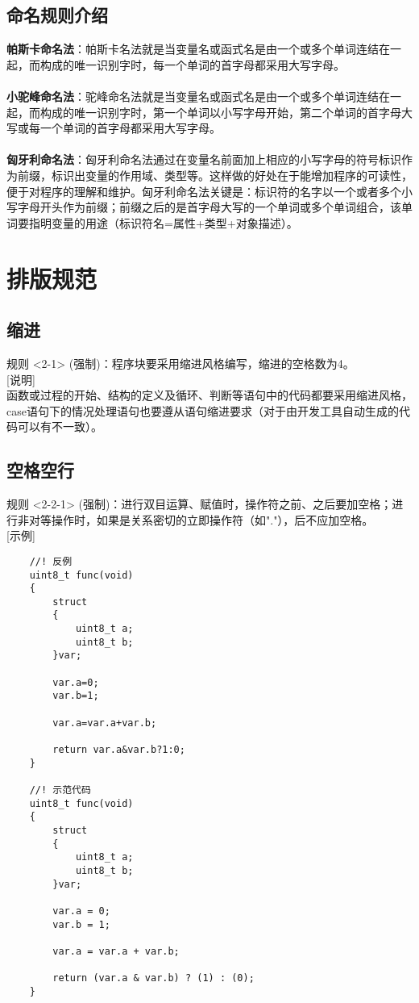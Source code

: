 \documentclass[UTF8,a4paper,12pt]{article}
\begin{document}
	\subsection{命名规则介绍}
	\textbf{帕斯卡命名法}：帕斯卡名法就是当变量名或函式名是由一个或多个单词连结在一起，而构成的唯一识别字时，每一个单词的首字母都采用大写字母。 \\
	\\
	\textbf{小驼峰命名法}：驼峰命名法就是当变量名或函式名是由一个或多个单词连结在一起，而构成的唯一识别字时，第一个单词以小写字母开始，第二个单词的首字母大写或每一个单词的首字母都采用大写字母。\\
	\\
	\textbf{匈牙利命名法}：匈牙利命名法通过在变量名前面加上相应的小写字母的符号标识作为前缀，标识出变量的作用域、类型等。这样做的好处在于能增加程序的可读性，便于对程序的理解和维护。匈牙利命名法关键是：标识符的名字以一个或者多个小写字母开头作为前缀；前缀之后的是首字母大写的一个单词或多个单词组合，该单词要指明变量的用途（标识符名=属性+类型+对象描述）。
	
	\newpage
	
	\section{排版规范}
	\subsection{缩进}
	规则 <2-1> (强制)：程序块要采用缩进风格编写，缩进的空格数为4。\\
	
	[说明]\\
	函数或过程的开始、结构的定义及循环、判断等语句中的代码都要采用缩进风格，case语句下的情况处理语句也要遵从语句缩进要求（对于由开发工具自动生成的代码可以有不一致）。\\
	
	\subsection{空格空行}
	规则 <2-2-1> (强制)：进行双目运算、赋值时，操作符之前、之后要加空格；进行非对等操作时，如果是关系密切的立即操作符（如"."），后不应加空格。\\
	
	[示例]\\
	\begin{lstlisting}
	//! 反例
	uint8_t func(void)
	{
		struct
		{
			uint8_t a;
			uint8_t b;
		}var;
		
		var.a=0;
		var.b=1;
		
		var.a=var.a+var.b;
		
		return var.a&var.b?1:0;
	}
	
	//! 示范代码
	uint8_t func(void)
	{
		struct
		{
			uint8_t a;
			uint8_t b;
		}var;
		
		var.a = 0;
		var.b = 1;
		
		var.a = var.a + var.b;
		
		return (var.a & var.b) ? (1) : (0);
	}
	\end{lstlisting}
	
\end{document}

